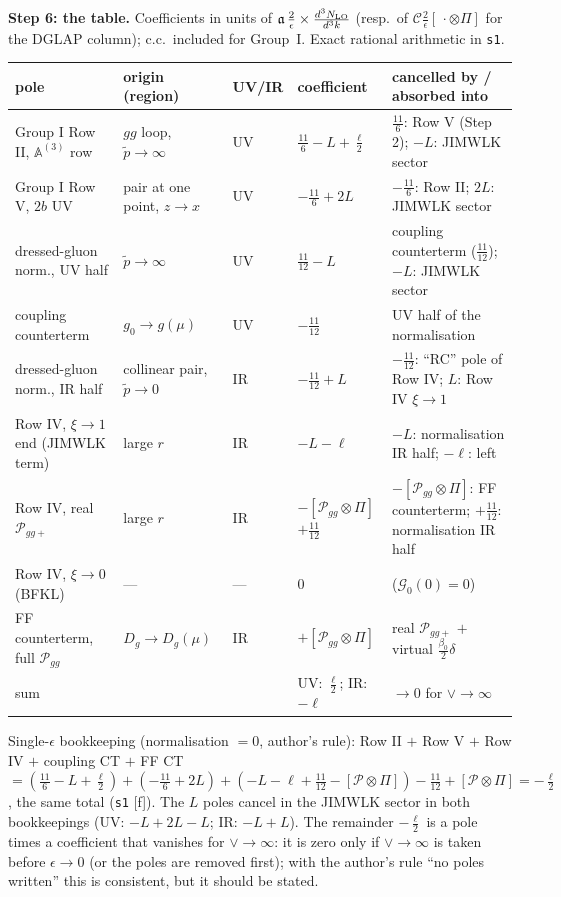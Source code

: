 \documentclass[10pt]{article}
\def\mf#1{\mathbb{#1}}
\begin{document}
\medskip
\noindent\textbf{Step 6: the table.} Coefficients in units of $\mathfrak{a}\,\frac{2}{\epsilon}\times\frac{d^{3}N_{\rm LO}}{d^{3}k}$ (resp.\ of $\mathcal{C}\frac{2}{\epsilon}[\,\cdot\otimes\Pi]$ for the DGLAP column); c.c.\ included for Group~I. Exact rational arithmetic in \texttt{s1}.
\begin{center}
\renewcommand{\arraystretch}{1.3}
\begin{tabular}{|p{4.3cm}|p{4.2cm}|p{1.1cm}|p{2.6cm}|p{4.9cm}|}\hline
pole & origin (region) & UV/IR & coefficient & cancelled by / absorbed into\\\hline
Group I Row II, $\mf{A}^{(3)}$ row & $gg$ loop, $\tilde p\to\infty$ & UV & $\frac{11}{6}-L+\frac{\ell}{2}$ & $\frac{11}{6}$: Row V (Step 2); $-L$: JIMWLK sector\\
Group I Row V, $2b$ UV & pair at one point, $z\to x$ & UV & $-\frac{11}{6}+2L$ & $-\frac{11}{6}$: Row II; $2L$: JIMWLK sector\\
dressed-gluon norm., UV half & $\tilde p\to\infty$ & UV & $\frac{11}{12}-L$ & coupling counterterm ($\frac{11}{12}$); $-L$: JIMWLK sector\\
coupling counterterm & $g_{0}\to g(\mu)$ & UV & $-\frac{11}{12}$ & UV half of the normalisation\\\hline
dressed-gluon norm., IR half & collinear pair, $\tilde p\to0$ & IR & $-\frac{11}{12}+L$ & $-\frac{11}{12}$: ``RC'' pole of Row IV; $L$: Row IV $\xi\to1$\\
Row IV, $\xi\to1$ end (JIMWLK term) & large $r$ & IR & $-L-\ell$ & $-L$: normalisation IR half; $-\ell$: left\\
Row IV, real $\mathcal{P}_{gg+}$ & large $r$ & IR & $-[\mathcal{P}_{gg}\otimes\Pi]$ $+\frac{11}{12}$ & $-[\mathcal{P}_{gg}\otimes\Pi]$: FF counterterm; $+\frac{11}{12}$: normalisation IR half\\
Row IV, $\xi\to0$ (BFKL) & --- & --- & $0$ & ($\mathcal{G}_{0}(0)=0$)\\
FF counterterm, full $\mathcal{P}_{gg}$ & $D_{g}\to D_{g}(\mu)$ & IR & $+[\mathcal{P}_{gg}\otimes\Pi]$ & real $\mathcal{P}_{gg+}$ $+$ virtual $\frac{\beta_{0}}{2}\delta$\\\hline
sum & & & UV: $\frac{\ell}{2}$; IR: $-\ell$ & $\to0$ for $\vee\to\infty$\\\hline
\end{tabular}
\end{center}
\noindent Single-$\epsilon$ bookkeeping (normalisation $=0$, author's rule): Row II $+$ Row V $+$ Row IV $+$ coupling CT $+$ FF CT $=(\frac{11}{6}-L+\frac{\ell}{2})+(-\frac{11}{6}+2L)+(-L-\ell+\frac{11}{12}-[\mathcal{P}\otimes\Pi])-\frac{11}{12}+[\mathcal{P}\otimes\Pi]=-\frac{\ell}{2}$, the same total (\texttt{s1} [f]). The $L$ poles cancel in the JIMWLK sector in both bookkeepings (UV: $-L+2L-L$; IR: $-L+L$). The remainder $-\frac{\ell}{2}$ is a pole times a coefficient that vanishes for $\vee\to\infty$: it is zero only if $\vee\to\infty$ is taken before $\epsilon\to0$ (or the poles are removed first); with the author's rule ``no poles written'' this is consistent, but it should be stated.
\end{document}
